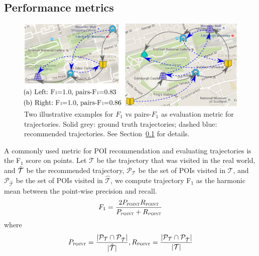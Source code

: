 \subsection{Performance metrics}
\label{sec:metric}
\secmoveup

\begin{figure}[t]
	\centering
	\includegraphics[width=\columnwidth]{fig/pairF1.pdf}
	\caption{Two illustrative examples for $F_1$ vs pairs-$F_1$ as evaluation metric for trajectories. Solid grey: ground truth trajectories; dashed blue: recommended trajectories.
    See Section~\ref{sec:metric} for details.}
	\label{fig:pairf1}\captionmoveup
\end{figure}


A commonly used metric for POI recommendation and evaluating trajectories is
the F$_1$ score on points.
Let $\mathcal{T}$ be the trajectory that was visited in the real world,
and $\hat{\cal T}$ be the recommended trajectory,
$\mathcal{P}_{\mathcal{T}}$ be the set of POIs visited in $\mathcal{T}$,
and $\mathcal{P}_{\hat{\mathcal{T}}}$ be the set of POIs visited in $\hat{\mathcal{T}}$,
we compute trajectory F$_1$ as the harmonic mean between the point-wise precision and recall.
\begin{displaymath}
F_1= \frac{2  P_{\textsc{point}}  R_{\textsc{point}}}
          {P_{\textsc{point}} + R_{\textsc{point}}}
\end{displaymath}
where
\vspace{-1.1em}
\begin{displaymath}%
P_{\textsc{point}} = \frac{|\mathcal{P}_{\mathcal{T}} \cap \mathcal{P}_{\hat{\mathcal{T}}}|}
                          {|\hat{\mathcal{T}}|},
R_{\textsc{point}} = \frac{|\mathcal{P}_{\mathcal{T}} \cap \mathcal{P}_{\hat{\mathcal{T}}}|}
                          {|\mathcal{T}|}
\end{displaymath}

